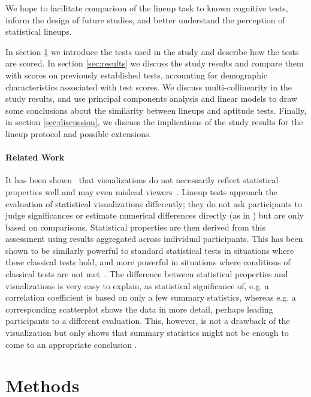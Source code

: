 \documentclass[journal]{vgtc}\usepackage[]{graphicx}\usepackage[]{color}
\begin{document}
We hope to facilitate comparison of the lineup task to known cognitive tests, inform the design of future studies, and better understand the perception of statistical lineups. 

In section \ref{sec:methods} we introduce the tests used in the study and describe how the tests are scored. In section \ref{sec:results} we discuss the study results and compare them with scores on previously established tests, accounting for demographic characteristics associated with test scores. We discuss multi-collinearity in the study results, and use principal components analysis and linear models to draw some conclusions about the similarity between lineups and aptitude tests. Finally, in section \ref{sec:discussion}, we discuss the implications of the study results for the lineup protocol and  possible extensions. 

\paragraph{Related Work}
It has been shown~\cite{pak2014} that visualizations do not necessarily reflect statistical properties well and may even mislead viewers~\cite{correll2013}. Lineup tests approach the evaluation of statistical visualizations differently; they do not ask participants to judge significances or estimate numerical differences directly (as in \cite{cleveland:1985, fuchs, talbot}) but are only based on comparisons. Statistical properties are then derived from this assessment using results aggregated across individual participants.  This has been shown to be similarly powerful to standard statistical tests in situations where these classical tests hold, and more powerful in situations where conditions of classical tests are not met~\cite{majumder2013validation}. The difference between statistical properties and visualizations is very easy to explain, as statistical significance of, e.g. a correlation coefficient is based on only a few summary statistics, whereas e.g. a corresponding scatterplot shows the data in more detail, perhaps leading participants to a different evaluation. This, however, is not a drawback of the visualization but only shows that summary statistics might not be enough to come to an appropriate conclusion \cite{anscombe:1973}. 

\section{Methods}\label{sec:methods}
\end{document}
